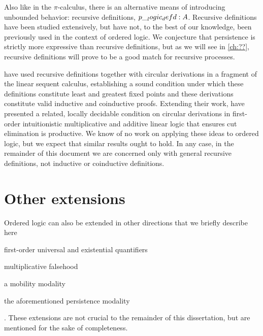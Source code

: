 Also like in the $\pi$-calculus, there is an alternative means of introducing unbounded behavior: recursive definitions, $p \__logic_defd: A$.
Recursive definitions have been studied extensively\autocites{??}, but have not, to the best of our knowledge, been previously used in the context of ordered logic.
We conjecture that persistence is strictly more expressive than recursive definitions, but as we will see in \cref{ch:??}, recursive definitions will prove to be a good match for recursive processes.

\Textcite{Fortier+Santocanale:CSL13} have used recursive definitions together with circular derivations in a fragment of the linear sequent calculus, establishing a sound condition under which these definitions constitute least and greatest fixed points and these derivations constitute valid inductive and coinductive proofs.
Extending their work, \textcite{Derakhshan+Pfenning:??} have presented a related, locally decidable condition on circular derivations in first-order intuitionistic multiplicative and additive linear logic that ensures cut elimination is productive.
We know of no work on applying these ideas to ordered logic, but we expect that similar results ought to hold.
In any case, in the remainder of this document we are concerned only with general recursive definitions, not inductive or coinductive definitions.

\section{Other extensions}\label{sec:ordered-logic:extensions}

Ordered logic can also be extended in other directions that we briefly describe here
\begin{itemize*}[label=, before=\unskip{:}, itemjoin={,}, itemjoin*={, and}]
\item first-order universal and existential quantifiers
\item multiplicative falsehood
\item a mobility modality
\item the aforementioned persistence modality
\end{itemize*}.
These extensions are not crucial to the remainder of this dissertation, but are mentioned for the sake of completeness.


